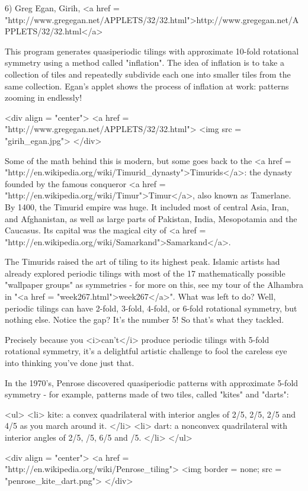 6) Greg Egan, Girih, <a href = "http://www.gregegan.net/APPLETS/32/32.html">http://www.gregegan.net/APPLETS/32/32.html</a>

This program generates quasiperiodic tilings with approximate 10-fold 
rotational symmetry using a method called "inflation".  The idea of
inflation is to take a collection of tiles and repeatedly subdivide 
each one into smaller tiles from the same collection.   Egan's applet
shows the process of inflation at work: patterns zooming in endlessly!  

<div align = "center">
<a href = "http://www.gregegan.net/APPLETS/32/32.html">
<img src = "girih_egan.jpg">
</div>

Some of the math behind this is modern, but some goes back to the <a
href = "http://en.wikipedia.org/wiki/Timurid_dynasty">Timurids</a>:
the dynasty founded by the famous conqueror <a href =
"http://en.wikipedia.org/wiki/Timur">Timur</a>, also known as
Tamerlane.  By 1400, the Timurid empire was huge.  It included most of
central Asia, Iran, and Afghanistan, as well as large parts of
Pakistan, India, Mesopotamia and the Caucasus.  Its capital was the
magical city of <a href =
"http://en.wikipedia.org/wiki/Samarkand">Samarkand</a>.

The Timurids raised the art of tiling to its highest peak.  Islamic
artists had already explored periodic tilings with most of the 17
mathematically possible "wallpaper groups" as symmetries - for more on
this, see my tour of the Alhambra in "<a href =
"week267.html">week267</a>".  What was left to do?  Well,
periodic tilings can have 2-fold, 3-fold, 4-fold, or 6-fold rotational
symmetry, but nothing else.  Notice the gap?  It's the number 5!  So
that's what they tackled.

Precisely because you <i>can't</i> produce periodic tilings with 5-fold
rotational symmetry, it's a delightful artistic challenge to fool
the careless eye into thinking you've done just that.

In the 1970's, Penrose discovered quasiperiodic patterns with 
approximate 5-fold symmetry - for example, patterns made of two 
tiles, called "kites" and "darts":

<ul>
<li>
kite: a convex quadrilateral with interior angles of 2\pi /5, 
2\pi /5, 2\pi /5 and 4\pi /5 as you march around it.  
</li>
<li>
dart: a nonconvex quadrilateral with interior angles of 2\pi /5, 
\pi /5, 6\pi /5 and \pi /5.  
</li>
</ul>

<div align = "center">
<a href = "http://en.wikipedia.org/wiki/Penrose_tiling">
<img border = none; src = "penrose_kite_dart.png">
</div>

